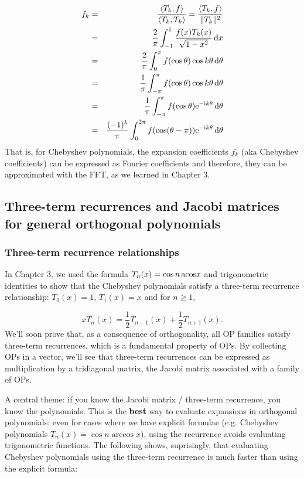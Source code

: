 \documentclass[12pt,landscape]{article}
\begin{document}
{\begin{eqnarray*}
f_k &=&  \frac{\langle T_k,f \rangle}{\langle T_k,T_k \rangle} = \frac{\langle T_k,f \rangle}{\| T_k \|^2} \\
   & = & \frac{2}{\pi}\int_{-1}^{1}   \frac{f(x) T_k(x)}{\sqrt{1 - x^2}}\,{\rm d}x  \\
   & = &  \frac{2}{\pi}\int_{0}^{\pi}   f(\cos \theta) \cos k\theta\,{\rm d}\theta \\
   & = & \frac{1}{\pi}\int_{-\pi}^{\pi}   f(\cos \theta) \cos k\theta\,{\rm d}\theta \\
   & = & \frac{1}{\pi}\int_{-\pi}^{\pi}   f(\cos \theta) {\rm e}^{-{\rm i}k\theta} \,{\rm d}\theta \\
   & = & \frac{(-1)^{k}}{\pi}\int_{0}^{2\pi}   f(\cos (\theta-\pi)) {\rm e}^{-{\rm i}k\theta} \,{\rm d}\theta
\end{eqnarray*}
That is, for Chebyshev polynomials, the expansion coefficients $f_k$ (aka Chebyshev coefficients) can be expressed as Fourier coefficients and therefore, they can be approximated with the FFT, as we learned in Chapter 3.

\subsection{Three-term recurrences and Jacobi matrices for general orthogonal polynomials}
\subsubsection{Three-term recurrence relationships}
In Chapter 3, we used the formula $T_n(x) = \cos n\,{\rm acos}x$ and trigonometric identities to show that the Chebyshev polynomials satisfy a three-term recurrence relationship: $T_0(x) = 1$, $T_1(x)= x$ and for $n \geq 1$,

\[
xT_{n}(x) = \frac{1}{2}T_{n-1}(x) + \frac{1}{2}T_{n+1}(x).
\]
We'll soon prove that, as a consequence of orthogonality, all OP families satisfy three-term recurrences, which is a fundamental property of OPs.  By collecting OPs in a vector, we'll see that three-term recurrences can be expressed as multiplication by a tridiagonal matrix, the Jacobi matrix associated with a family of OPs.   

A central theme: if you know the Jacobi matrix / three-term recurrence, you know the polynomials. This is the \textbf{best} way to evaluate expansions in orthogonal polynomials: even for cases where we have explicit formulae (e.g. Chebyshev polynomials $T_n(x) = \cos n \arccos x$), using the recurrence avoids evaluating trigonometric functions.  The following shows, suprisingly, that evaluating Chebyshev polynomials using the three-term recurrence is much faster than using the explicit formula:


}
\end{document}
